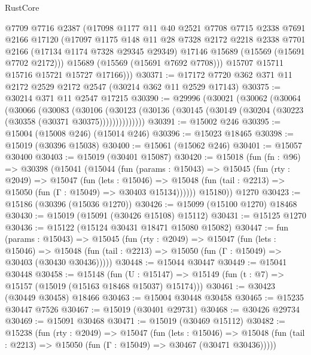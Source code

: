 \begin{lexlean}{RustCore}
\begin{coremodule}
          @7709
          @7716
          @2387
          (@17098
            @1177
            @11
            @40
            @2521
            @7708
            @7715
            @2338
            @7691
            @2166
            @17120
            (@17097
              @1175
              @148
              @11
              @28
              @7328
              @2172
              @2218
              @2338
              @7701
              @2166
              (@17134 @1174 @7328 @29345 @29349)
              @17146
              @15689
              (@15569 (@15691 @7702 @2172)))
            @15689
            (@15569 (@15691 @7692 @7708)))
          @15707
          @15711
          @15716
          @15721
          @15727
          @17166)))
@30371 := @17172 @7720 @362 @371 @11 @2172 @2529 @2172 @2547 (@30214 @362 @11 @2529 @17143)
@30375 := @30214 @371 @11 @2547 @17215
@30390 := @29996
    (@30021
      (@30062
        (@30064
          (@30066
            (@30083
              (@30106
                (@30123 (@30136 (@30145 (@30149 (@30204 (@30223 (@30358 (@30371 @30375))))))))))))))
@30391 := @15002 @246
@30395 := @15004 (@15008 @246) (@15014 @246)
@30396 := @15023 @18465
@30398 := @15019 (@30396 @15038)
@30400 := @15061 (@15062 @246)
@30401 := @15057 @30400
@30403 := @15019 (@30401 @15087)
@30420 := @15018
    (fun (fn : @96) =>
    @30398
      (@15041
        (@15044
          (fun (params : @15043) =>
          @15045
            (fun (rty : @2049) =>
            @15047
              (fun (lets : @15046) =>
              @15048 (fun (tail : @2213) => @15050 (fun (Γ : @15049) => @30403 @15134))))))
        @15180))
    @1270
@30423 := @15186 (@30396 (@15036 @1270))
@30426 := @15099 (@15100 @1270) @18468
@30430 := @15019 (@15091 (@30426 @15108) @15112)
@30431 := @15125 @1270
@30436 := @15122 (@15124 @30431 @18471 @15080 @15082)
@30447 := fun (params : @15043) =>
  @15045
    (fun (rty : @2049) =>
    @15047
      (fun (lets : @15046) =>
      @15048 (fun (tail : @2213) => @15050 (fun (Γ : @15049) => @30403 (@30430 @30436)))))
@30448 := @15044 @30447
@30449 := @15041 @30448
@30458 := @15148
    (fun (U : @15147) => @15149 (fun (t : @7) => @15157 (@15019 (@15163 @18468 @15037) @15174)))
@30461 := @30423 (@30449 @30458) @18466
@30463 := @15004 @30448 @30458
@30465 := @15235 @30447 @7526
@30467 := @15019 (@30401 @29731)
@30468 := @30426 @29734
@30469 := @15091 @30468
@30471 := @15019 (@30469 @15112)
@30482 := @15238
    (fun (rty : @2049) =>
    @15047
      (fun (lets : @15046) =>
      @15048 (fun (tail : @2213) => @15050 (fun (Γ : @15049) => @30467 (@30471 @30436)))))

\end{coremodule}
\end{lexlean}
